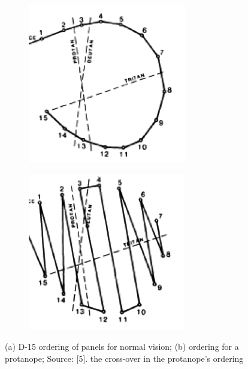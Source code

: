 \documentclass[10pt,twocolumn,letterpaper]{article}
\begin{document}
\begin{figure}[h]
  \begin{subfigure}{0.22\textwidth}
    \includegraphics[width=\textwidth]{luv1.png}
    \caption{}
  \end{subfigure}
  \begin{subfigure}{0.22\textwidth}
    \includegraphics[width=\textwidth]{luv2.png}
    \caption{}
  \end{subfigure}
  \caption{(a) D-15 ordering of panels for normal vision; (b) ordering for a protanope; Source: [5]. the cross-over in the protanope's ordering}
  \label{fig:luv}
\end{figure}
\end{document}
